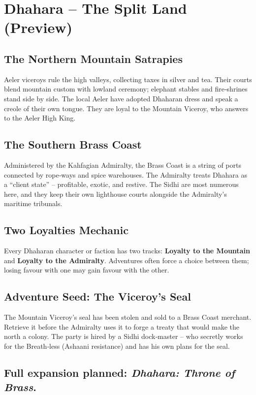 \documentclass[11pt]{book}
\begin{document}
\section{Dhahara -- The Split Land (Preview)}

\subsection*{The Northern Mountain Satrapies}
Aeler viceroys rule the high valleys, collecting taxes in silver and tea. Their courts blend mountain custom with lowland ceremony; elephant stables and fire‑shrines stand side by side. The local Aeler have adopted Dhaharan dress and speak a creole of their own tongue. They are loyal to the Mountain Viceroy, who answers to the Aeler High King.

\subsection*{The Southern Brass Coast}
Administered by the Kahfagian Admiralty, the Brass Coast is a string of ports connected by rope‑ways and spice warehouses. The Admiralty treats Dhahara as a “client state” – profitable, exotic, and restive. The Sidhi are most numerous here, and they keep their own lighthouse courts alongside the Admiralty’s maritime tribunals.

\subsection*{Two Loyalties Mechanic}
Every Dhaharan character or faction has two tracks: \textbf{Loyalty to the Mountain} and \textbf{Loyalty to the Admiralty}. Adventures often force a choice between them; losing favour with one may gain favour with the other.

\subsection*{Adventure Seed: The Viceroy’s Seal}
The Mountain Viceroy’s seal has been stolen and sold to a Brass Coast merchant. Retrieve it before the Admiralty uses it to forge a treaty that would make the north a colony. The party is hired by a Sidhi dock‑master – who secretly works for the Breath‑less (Ashaani resistance) and has his own plans for the seal.

\subsection*{Full expansion planned: \textit{Dhahara: Throne of Brass}.}
\end{document}
